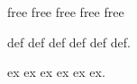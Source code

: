 free free free
free free

\begin{group}
\begin{definition}
  def def def
  def
  def def.
\end{definition}


\begin{example}
  ex ex ex
  ex
  ex ex.
\end{example}

\end{group}
